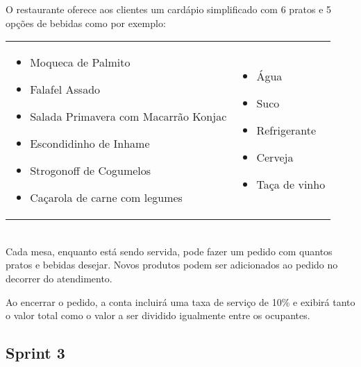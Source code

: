 \documentclass[11pt,brazil, a4paper, fullpage]{article}
\begin{document}
O restaurante oferece aos clientes um cardápio simplificado com 6 pratos e 5 opções de bebidas como por exemplo: \\


\begin{tabular}{ll}
\begin{minipage}{.45\textwidth}
\begin{itemize}
    \item Moqueca de Palmito
    \item Falafel Assado
    \item Salada Primavera com Macarrão Konjac
    \item Escondidinho de Inhame
    \item Strogonoff de Cogumelos
    \item Caçarola de carne com legumes
\end{itemize}
\end{minipage} &

\begin{minipage}{.45\textwidth}
\begin{itemize}
    \item Água
    \item Suco
    \item Refrigerante
    \item Cerveja
    \item Taça de vinho
\end{itemize}
\end{minipage} \\
\end{tabular} \\



Cada mesa, enquanto está sendo servida, pode fazer um pedido com quantos pratos e bebidas desejar. Novos produtos podem ser adicionados ao pedido no decorrer do atendimento.

Ao encerrar o pedido, a conta incluirá uma taxa de serviço de 10\% e exibirá tanto o valor total como o valor a ser dividido igualmente entre os ocupantes.


\subsection{Sprint 3}



\begin{center}
    \setlength{\fboxsep}{10pt}
\end{center}
\end{document}
